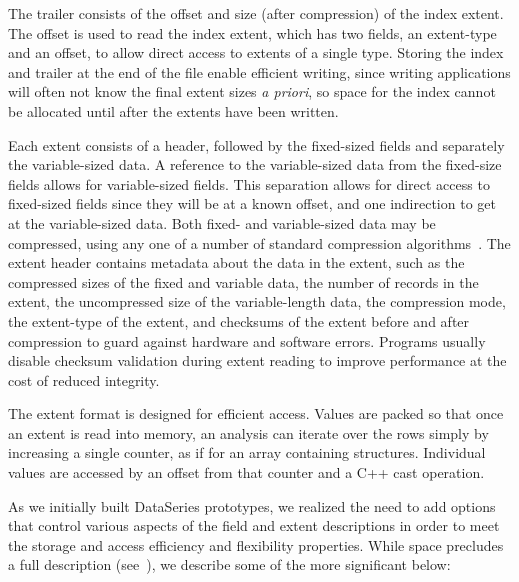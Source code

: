\documentclass{acm_proc_article-sp}
\begin{document}
The trailer
consists of the offset and size (after compression) of the index
extent.  The offset is used to read the index extent, which has two
fields, an extent-type and an offset, to allow direct access to
extents of a single type. Storing the index and trailer at the end
of the file enable efficient writing, since writing applications will
often not know
the final extent sizes \textit{a priori},
so space 
for the index cannot be allocated until after the extents have been written.

Each extent consists of a header, followed by the fixed-sized fields
and separately the variable-sized data.  A reference to the 
variable-sized data from the fixed-size fields allows for variable-sized
fields.  This separation allows for direct access to fixed-sized
fields since they will be at a known offset, and one indirection to
get at the variable-sized data.  Both fixed- and variable-sized data
may be compressed, using any one of a number of standard compression
algorithms~\cite{BZIP,GZIP,LZF,LZO}.  The extent header contains
metadata about the data in the extent, such as the compressed sizes of
the fixed and variable data, the number of records in the extent, the
uncompressed size of the variable-length data, the compression mode,
the extent-type of the extent, and checksums of the extent before and
after compression to guard against hardware and software errors.
Programs usually disable checksum validation during extent reading to
improve performance at the cost of reduced integrity.

The extent format is designed for efficient access. Values are packed
so that once an extent is read into memory, an analysis can iterate
over the rows simply by increasing a single counter, as if for an
array containing structures.  Individual values are accessed by an
offset from that counter and a C++ cast operation. 

As we initially built DataSeries prototypes, we realized the need to
add options that control various aspects of the field and extent
descriptions in order to meet the storage and access efficiency and
flexibility properties.  While space precludes a full description
(see~\cite{DSTechnicalReportSnapshot}), we describe some of the more
significant below:
\end{document}
